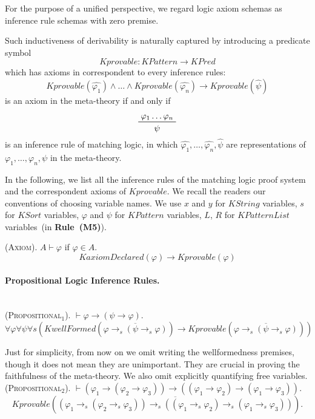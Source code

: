 \documentclass[UTF8,11pt]{article}
\theoremstyle{plain}
\theoremstyle{definition}
\theoremstyle{remark}
\newcommand{\KPred}{\mathit{KPred}}
\newcommand{\KString}{\mathit{KString}}
\newcommand{\KSort}{\mathit{KSort}}
\newcommand{\KPatternList}{\mathit{KPatternList}}
\newcommand{\KPattern}{\mathit{KPattern}}
\newcommand{\KaxiomDeclared}{\mathit{KaxiomDeclared}}
\newcommand{\Kderivable}{\Kdeduce}
\newcommand{\KwellFormed}{\mathit{KwellFormed}}
\newcommand{\Kdeduce}{\mathit{Kprovable}}
\begin{document}
For the purpose of a unified perspective, we regard logic axiom schemas as 
inference 
rule schemas with zero premise.

Such inductiveness of derivability is naturally captured by 
introducing a predicate symbol
$$
\Kdeduce \colon \KPattern \to \KPred
$$
which has axioms in correspondent to every inference rules:
$$\Kderivable(\widehat{\varphi_1}) \wedge \dots \wedge 
\Kderivable(\widehat{\varphi_n}) \to \Kderivable(\widehat{\psi})$$
is an axiom in the meta-theory if and only if 
$$
	\prftree
	{ \varphi_1 \dots  \varphi_n}
	{ \psi }
$$
is an inference rule of matching logic, in which $\widehat{\varphi_1}, \dots, 
\widehat{\varphi_n}, \widehat{\psi}$ are representations of $\varphi_1, \dots, 
\varphi_n, \psi$ in the meta-theory.

In the following, we list all the inference rules of the matching logic proof 
system and the correspondent axioms of $\Kdeduce$. We recall the readers our 
conventions of choosing variable names. 
We use 
$x$ and $y$ for $\KString$ variables,
$s$ for $\KSort$ variables,
$\varphi$ and $\psi$ for $\KPattern$ variables,
$L$, $R$ for $\KPatternList$ variables~(in \textbf{Rule~(M5)}).

(\textsc{Axiom}).\quad
$A \vdash \varphi$ if $\varphi \in A$.
\begin{equation*}
\KaxiomDeclared(\varphi) \to \Kdeduce(\varphi)
\end{equation*}

\paragraph{Propositional Logic Inference Rules.}\quad
\\

(\textsc{Propositional$_1$}).\quad
$\vdash \varphi \to (\psi \to \varphi)$.
\begin{equation*}
\forall \varphi \forall \psi \forall s \left(
\KwellFormed(\overline{\varphi \to_s (\psi \to_s  \varphi)}) \to
\Kdeduce(\overline{\varphi \to_s (\psi \to_s  \varphi)})\right)
\end{equation*}

Just for simplicity, from now on we omit writing the wellformedness premises, 
though it does not mean they are unimportant.
They are crucial in proving the faithfulness of the meta-theory.
We also omit explicitly quantifying free variables.
\\

(\textsc{Propositional$_2$}).\quad
$\vdash (\varphi_1 \to (\varphi_2 \to \varphi_3)) \to ((\varphi_1 \to \varphi_2) \to (\varphi_1 \to \varphi_3))$.
\begin{equation*}
\Kdeduce(
\overline{(\varphi_1 \to_s (\varphi_2 \to_s \varphi_3)) \to_s ((\varphi_1 \to_s 
\varphi_2) \to_s (\varphi_1 \to_s \varphi_3))}).
\end{equation*}
\end{document}
